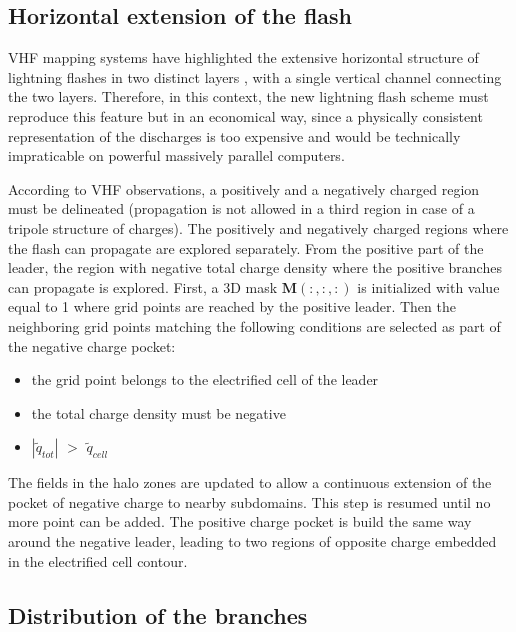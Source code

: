 \subsection{Horizontal extension of the flash}

VHF mapping systems have highlighted the extensive horizontal structure of lightning flashes in two distinct layers \citep{Shao-Krehbiel-1996,Rison-1999,Thomas-2001,Wiens-2005,Bruning-2007}, with a single vertical channel connecting the two layers. 
Therefore, in this context, the new lightning flash scheme must reproduce this feature but in an economical way, since a physically consistent representation of the discharges is too expensive and would be technically impraticable on powerful massively parallel computers.

According to VHF observations, a positively and a negatively charged region must be delineated (propagation is not allowed in a third region in case of a tripole structure of charges).
The positively and negatively charged regions where the flash can propagate are explored separately. 
From the positive part of the leader, the region with negative total charge density where the positive branches can propagate is explored. 
First, a 3D mask $\mathbf{M}(:,:,:)$ is initialized with value equal to 1 where grid points are reached by the positive leader. 
Then the neighboring grid points matching the following conditions are selected as part of the negative charge pocket:
\begin{itemize} 
 \item the grid point belongs to the electrified cell of the leader
 \item the total charge density must be negative
 \item $|\tilde q_{tot}|$ $>$ $\tilde q_{cell}$ 
\end{itemize}
The fields in the halo zones are updated to allow a continuous extension of the pocket of negative charge to nearby subdomains.
This step is resumed until no more point can be added. 
The positive charge pocket is build the same way around the negative leader, leading to two regions of opposite charge embedded in the electrified cell contour.

\subsection{Distribution of the branches}

